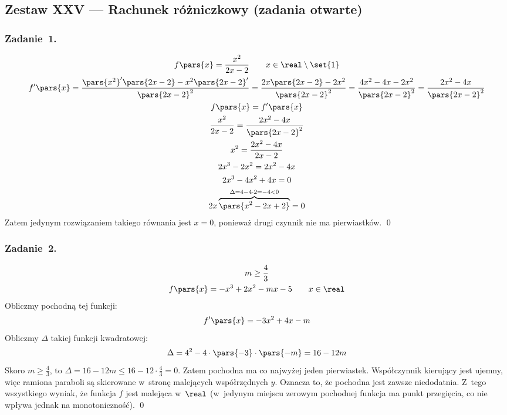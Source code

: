 \subsection*{Zestaw XXV --- Rachunek różniczkowy (zadania otwarte)}
\subsubsection*{Zadanie~1.}
\begin{gather*}
    f\pars{x} = \frac{x^2}{2x - 2} \qquad x \in \real \setminus \set{1}\\
    f'\pars{x}
        = \frac{\pars{x^2}'\pars{2x - 2} - x^2\pars{2x - 2}'}{\pars{2x - 2}^2}
        = \frac{2x\pars{2x - 2} - 2x^2}{\pars{2x - 2}^2}
        = \frac{4x^2 - 4x - 2x^2}{\pars{2x - 2}^2}
        = \frac{2x^2 - 4x}{\pars{2x - 2}^2}\\
    f\pars{x} = f'\pars{x}\\
    \frac{x^2}{2x - 2} = \frac{2x^2 - 4x}{\pars{2x - 2}^2}\\
    x^2 = \frac{2x^2 - 4x}{2x - 2}\\
    2x^3 - 2x^2 = 2x^2 - 4x\\
    2x^3 - 4x^2 + 4x = 0\\
    2x\overbrace{\pars{x^2 - 2x + 2}}^{\Delta = 4 - 4 \cdot 2 = -4 < 0} = 0
\end{gather*}
Zatem jedynym rozwiązaniem takiego równania jest \(x = 0\), ponieważ drugi czynnik nie ma pierwiastków.
\qed
\subsubsection*{Zadanie~2.}
\begin{gather*}
    m \geq \frac{4}{3}\\
    f\pars{x} = -x^3 + 2x^2 - mx - 5 \qquad x \in \real
\end{gather*}
Obliczmy pochodną tej funkcji:
\begin{equation*}
    f'\pars{x} = -3x^2 + 4x - m
\end{equation*}
Obliczmy \(\Delta\) takiej funkcji kwadratowej:
\begin{equation*}
    \Delta = 4^2 - 4 \cdot \pars{-3} \cdot \pars{-m}
        = 16 - 12m
\end{equation*}
Skoro \(m \geq \frac{4}{3}\), to \(\Delta = 16 - 12m \leq 16 - 12 \cdot \frac{4}{3} = 0\). Zatem pochodna ma co najwyżej jeden pierwiastek. Współczynnik kierujący jest ujemny, więc ramiona paraboli są skierowane w~stronę malejących współrzędnych \(y\). Oznacza to, że pochodna jest zawsze niedodatnia. Z~tego wszystkiego wyniak, że funkcja \(f\) jest malejąca w~\(\real\) (w~jedynym miejscu zerowym pochodnej funkcja ma punkt przegięcia, co nie wpływa jednak na monotoniczność).
\qed
